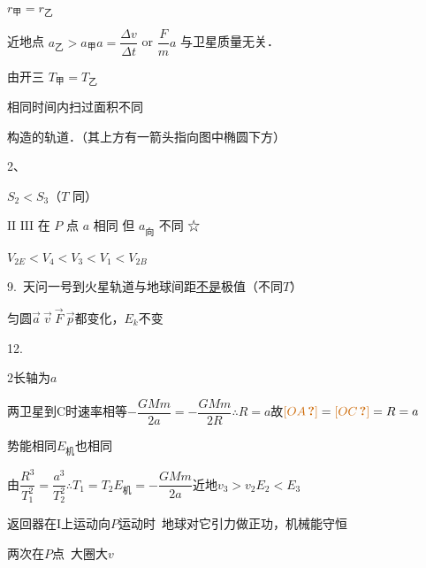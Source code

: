 $r_{\text{甲}}=r_{\text{乙}}$%

近地点 $a_{\text{乙}}>a_{\text{甲}}$\quad\quad $a=\dfrac{\Delta v}{\Delta t}$ or $\dfrac Fm$\quad $a$ 与卫星质量无关．

由开三 $T_{\text{甲}}=T_{\text{乙}}$

相同时间内扫过面积不同

构造的轨道．（其上方有一箭头指向图中椭圆下方）

2、


$S_2<S_3$（$T$ 同）

$\mathrm{II}$ $\mathrm{III}$ 在 $P$ 点 $a$ 相同 但 $a_{\text{向}}$ 不同 ☆%

$V_{2E}<V_4<V_3<V_1<V_{2B}$

9.\ 天问一号到火星轨道与地球间距\underline{不是}极值（不同$T$） %

匀圆\quad $\vec{a}\ \vec{v}\ \vec{F}\ \vec{p}$都变化，$E_k$不变

12.

2长轴为$a$

两卫星到C时速率相等\quad $-\dfrac{GMm}{2a}=-\dfrac{GMm}{2R}$\quad $\therefore R=a$\quad 故$\unclear{OA}=\unclear{OC}=R=a$

势能相同\qquad $E_{\text{机}}$也相同

由$\dfrac{R^3}{T_1^2}=\dfrac{a^3}{T_2^2}$\quad $\therefore T_1=T_2$\qquad $E_{\text{机}}=-\dfrac{GMm}{2a}$\qquad 近地$v_3>v_2$\qquad $E_2<E_3$


返回器在I上运动向$P$运动时\ 地球对它引力做正功，机械能守恒

两次在$P$点\ 大圈大$v$

